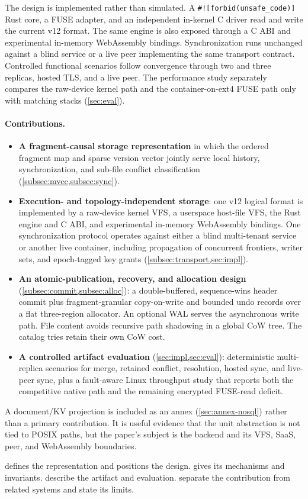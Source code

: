 The design is implemented rather than simulated.  A
\texttt{\#![forbid(unsafe\_code)]} Rust core, a FUSE adapter, and an independent
in-kernel C driver read and write the current v12 format.  The same engine is
also exposed through a C ABI and experimental in-memory WebAssembly bindings.
Synchronization runs unchanged against a blind service or a live peer
implementing the same transport contract.  Controlled functional scenarios
follow convergence through two and three replicas, hosted TLS, and a live peer.
The performance study separately compares the raw-device kernel path and the
container-on-ext4 FUSE path only with matching stacks (\cref{sec:eval}).

\paragraph{Contributions.}
\begin{itemize}[leftmargin=1.4em,itemsep=2pt]
  \item \textbf{A fragment-causal storage representation} in which the ordered
    fragment map and sparse version vector jointly serve local history,
    synchronization, and sub-file conflict classification
    (\cref{subsec:mvcc,subsec:sync}).
  \item \textbf{Execution- and topology-independent storage}: one v12 logical
    format is implemented by a raw-device kernel VFS, a userspace host-file VFS,
    the Rust engine and C ABI, and experimental in-memory WebAssembly bindings.
    One synchronization protocol operates against either a blind multi-tenant
    service or another live container, including propagation of concurrent
    frontiers, writer sets, and epoch-tagged key grants
    (\cref{subsec:transport,sec:impl}).
  \item \textbf{An atomic-publication, recovery, and allocation design}
    (\cref{subsec:commit,subsec:alloc}): a double-buffered, sequence-wins header
    commit plus fragment-granular copy-on-write and bounded undo records over a
    flat three-region allocator.  An optional WAL serves the asynchronous write
    path.  File content avoids recursive path shadowing in a global CoW tree.
    The catalog tries retain their own CoW cost.
  \item \textbf{A controlled artifact evaluation}
    (\cref{sec:impl,sec:eval}): deterministic multi-replica scenarios for
    merge, retained conflict, resolution, hosted sync, and live-peer sync, plus
    a fault-aware Linux throughput study that reports both the competitive
    native path and the remaining encrypted FUSE-read deficit.
\end{itemize}

A document/KV projection is included as an annex
(\cref{sec:annex-nosql}) rather than a primary
contribution.  It is useful evidence that the unit abstraction is not tied to
POSIX paths, but the paper's subject is the backend and its VFS, SaaS, peer, and
WebAssembly boundaries.

 defines the representation and positions the design.
 gives its mechanisms and invariants.  
describe the artifact and evaluation.  
separate the contribution from related systems and state its limits.
